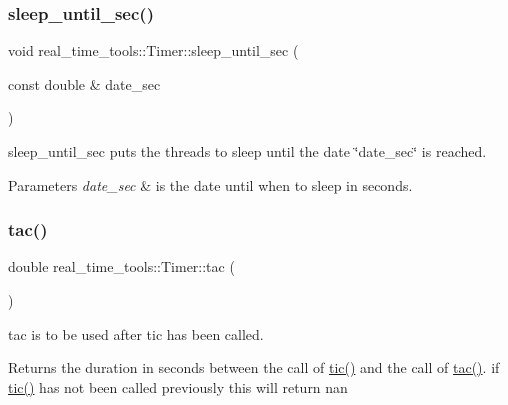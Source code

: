 \subsubsection{\texorpdfstring{sleep\+\_\+until\+\_\+sec()}{sleep\_until\_sec()}}
{\footnotesize\ttfamily void real\+\_\+time\+\_\+tools\+::\+Timer\+::sleep\+\_\+until\+\_\+sec (\begin{DoxyParamCaption}\item[{const double \&}]{date\+\_\+sec }\end{DoxyParamCaption})\hspace{0.3cm}{\ttfamily [static]}}



sleep\+\_\+until\+\_\+sec puts the threads to sleep until the date \char`\"{}date\+\_\+sec\char`\"{} is reached. 


\begin{DoxyParams}{Parameters}
{\em date\+\_\+sec} & is the date until when to sleep in seconds. \\
\hline
\end{DoxyParams}
\mbox{\label{classreal__time__tools_1_1Timer_a3d55794492714544c5c83aed23d8f1f9}} 
\subsubsection{\texorpdfstring{tac()}{tac()}}
{\footnotesize\ttfamily double real\+\_\+time\+\_\+tools\+::\+Timer\+::tac (\begin{DoxyParamCaption}{ }\end{DoxyParamCaption})}



tac is to be used after tic has been called. 

\begin{DoxyReturn}{Returns}
the duration in seconds between the call of \hyperlink{classreal__time__tools_1_1Timer_a540f7f6925768c6f333b2fef4a914374}{tic()} and the call of \hyperlink{classreal__time__tools_1_1Timer_a3d55794492714544c5c83aed23d8f1f9}{tac()}. if \hyperlink{classreal__time__tools_1_1Timer_a540f7f6925768c6f333b2fef4a914374}{tic()} has not been called previously this will return nan 
\end{DoxyReturn}
\mbox{\label{classreal__time__tools_1_1Timer_a540f7f6925768c6f333b2fef4a914374}} 
